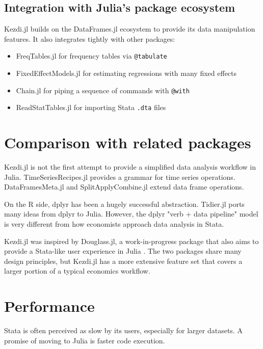 \documentclass{juliacon}
\begin{document}
\subsection{Integration with Julia's package ecosystem}

Kezdi.jl builds on the DataFrames.jl ecosystem \citep{DataFrame.jl2023} to provide its data manipulation features. It also integrates tightly with other packages:

\begin{itemize}
	\item FreqTables.jl \citep{FreqTables.jl2023} for frequency tables via \texttt{@tabulate}
	\item FixedEffectModels.jl \citep{FixedEffectModels.jl2023} for estimating regressions with many fixed effects
	\item Chain.jl for piping a sequence of commands with \texttt{@with}
	\item ReadStatTables.jl for importing Stata \texttt{.dta} files
\end{itemize}

\section{Comparison with related packages}

Kezdi.jl is not the first attempt to provide a simplified data analysis workflow in Julia. TimeSeriesRecipes.jl \citep{TimeSeriesRecipes2022} provides a grammar for time series operations. DataFramesMeta.jl \citep{DataFramesMeta2023} and SplitApplyCombine.jl \citep{SplitApplyCombine2023} extend data frame operations.

On the R side, dplyr \citep{dplyr2023} has been a hugely successful abstraction. Tidier.jl \citep{tidier2022} ports many ideas from dplyr to Julia. However, the dplyr "verb + data pipeline" model is very different from how economists approach data analysis in Stata.

Kezdi.jl was inspired by Douglass.jl, a work-in-progress package that also aims to provide a Stata-like user experience in Julia \citep{Douglass.jl2023}. The two packages share many design principles, but Kezdi.jl has a more extensive feature set that covers a larger portion of a typical economics workflow.

\section{Performance}

Stata is often perceived as slow by its users, especially for larger datasets. A promise of moving to Julia is faster code execution.
\end{document}
